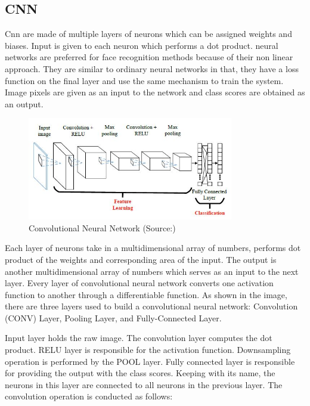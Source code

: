 \documentclass[conference]{IEEEtran}
\begin{document}
\subsection{CNN}
\label{subsec:3.3 CNN}
Cnn are made of multiple layers of neurons which can be assigned weights and biases. Input is given to each neuron which performs a dot product. neural networks are preferred for face recognition methods because of their non linear approach. They are similar to ordinary neural networks in that, they have a loss function on the final layer and use the same mechanism to train the system. Image pixels are given as an input to the network and class scores are obtained as an output. 

\begin{figure}[h!]
 \centering
 \includegraphics[width = 9cm]{cnn_arch.JPG}
 \caption{ Convolutional Neural Network (Source:\cite{cheung2012convolutional})}
 \label{fig 1: Convolutional Neural Network}
\end{figure}

Each layer of neurons take in a multidimensional array of numbers, performs dot product of the weights and corresponding area of the input. The output is another multidimensional array of numbers which serves as an input to the next layer. Every layer of convolutional neural network converts one activation function to another through a differentiable function. As shown in the image, there are three layers used to build a convolutional neural network: Convolution (CONV) Layer, Pooling Layer, and Fully-Connected Layer.

Input layer holds the raw image. The convolution layer computes the dot product. RELU layer is responsible for the activation function. Downsampling operation is performed by the POOL layer. Fully connected layer is responsible for providing the output with the class scores. Keeping with its name, the neurons in this layer are connected to all neurons in the previous layer. The convolution operation is conducted as follows:
\end{document}
